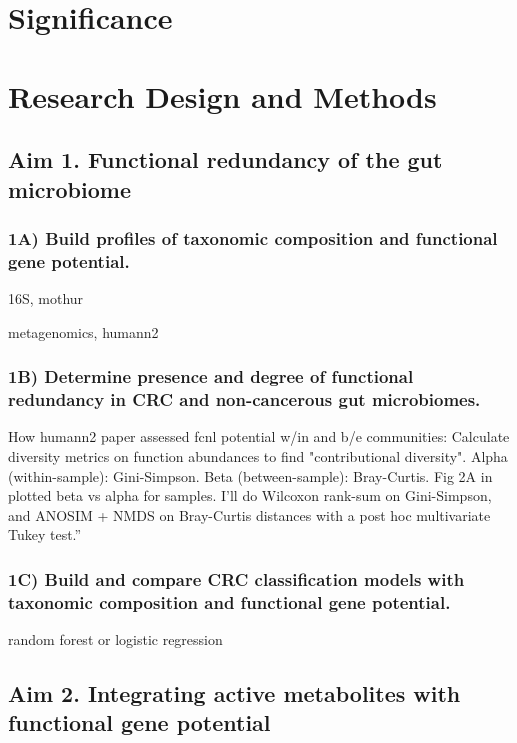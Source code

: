 \documentclass[11pt]{article}
\begin{document}
\section*{Significance} %


\section*{Research Design and Methods}

\subsection*{Aim 1. Functional redundancy of the gut microbiome}

\subsubsection*{1A) Build profiles of taxonomic composition and functional gene potential.}

16S, mothur

metagenomics, humann2

\subsubsection*{1B) Determine presence and degree of functional redundancy in CRC and non-cancerous gut microbiomes.}

How humann2 paper assessed fcnl potential w/in and b/e communities:
Calculate diversity metrics on function abundances to find "contributional diversity".
Alpha (within-sample): Gini-Simpson. Beta (between-sample): Bray-Curtis.
Fig 2A in \cite{franzosa_species-level_2018} plotted beta vs alpha for samples.
I'll do Wilcoxon rank-sum on Gini-Simpson, and ANOSIM + NMDS on Bray-Curtis distances with a post hoc multivariate Tukey test.'' \cite{hannigan_diagnostic_2018}

\subsubsection*{1C) Build and compare CRC classification models with taxonomic composition and functional gene potential.}

random forest or logistic regression

\subsection*{Aim 2. Integrating active metabolites with functional gene potential}
\end{document}
